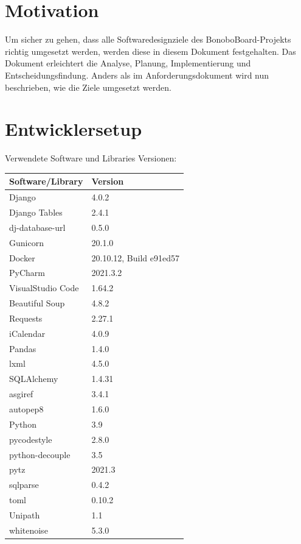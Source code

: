 \documentclass[a4paper,11pt]{scrartcl}
\begin{document}



\section{Motivation}
Um sicher zu gehen, dass alle Softwaredesignziele des BonoboBoard-Projekts richtig umgesetzt werden, werden diese in diesem Dokument festgehalten. Das Dokument erleichtert die Analyse, Planung, Implementierung und Entscheidungsfindung. Anders als im Anforderungsdokument wird nun beschrieben, wie die Ziele umgesetzt werden. 

\section{Entwicklersetup}
Verwendete Software und Libraries Versionen:
\begin{table}[H]
\begin{tabular}{|p{5cm}|p{5cm}|}
\hline
\textbf{Software/Library} & \textbf{Version} \\ \hline
	Django &  4.0.2\\ \hline
	Django Tables & 2.4.1 \\ \hline
	dj-database-url & 0.5.0 \\ \hline
	Gunicorn & 20.1.0 \\ \hline
	Docker & 20.10.12, Build e91ed57 \\ \hline
	PyCharm & 2021.3.2 \\ \hline
	VisualStudio Code & 1.64.2 \\ \hline
	Beautiful Soup & 4.8.2 \\ \hline
	Requests & 2.27.1 \\ \hline
	iCalendar & 4.0.9 \\ \hline
	Pandas & 1.4.0 \\ \hline
	lxml & 4.5.0 \\ \hline
	SQLAlchemy & 1.4.31 \\ \hline
	asgiref & 3.4.1 \\ \hline
	autopep8 & 1.6.0 \\ \hline
	Python & 3.9 \\ \hline
	pycodestyle & 2.8.0 \\ \hline
	python-decouple & 3.5 \\ \hline
	pytz & 2021.3 \\ \hline
	sqlparse & 0.4.2 \\ \hline
	toml & 0.10.2 \\ \hline
	Unipath & 1.1 \\ \hline
	whitenoise & 5.3.0 \\ \hline
\end{tabular}
\end{table}
\end{document}
